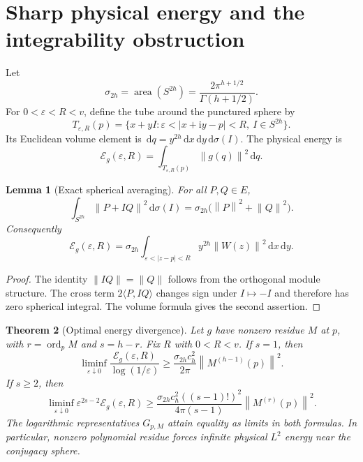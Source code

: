 \documentclass[11pt,a4paper]{article}
\numberwithin{equation}{section}
\newtheorem{theorem}{Theorem}[section]
\newtheorem{lemma}[theorem]{Lemma}
\theoremstyle{definition}
\theoremstyle{remark}
\newcommand{\ii}{\mathrm i}
\newcommand{\ord}{\operatorname{ord}}
\newcommand{\dd}{\,\mathrm d}
\newcommand{\norm}[1]{\left\lVert#1\right\rVert}
\newcommand{\sig}{\sigma_{2h}}
\begin{document}
\section{Sharp physical energy and the integrability obstruction}
\label{sec:energy}

Let
\[
 \sig=\operatorname{area}(S^{2h})
       =\frac{2\pi^{h+1/2}}{\Gamma(h+1/2)}.
\]
For $0<\varepsilon<R<v$, define the tube around the punctured sphere by
\[
 T_{\varepsilon,R}(p)
 =\{x+yI:\varepsilon<|x+\ii y-p|<R,\ I\in S^{2h}\}.
\]
Its Euclidean volume element is
$\dd q=y^{2h}\dd x\dd y\dd\sigma(I)$. The physical energy is
\begin{equation}\label{eq:physical-energy}
 \mathcal E_g(\varepsilon,R)
 =\int_{T_{\varepsilon,R}(p)}\norm{g(q)}^2\dd q.
\end{equation}

\begin{lemma}[Exact spherical averaging]\label{lem:spherical-average}
For all $P,Q\in E$,
\begin{equation}\label{eq:spherical-average}
 \int_{S^{2h}}\norm{P+IQ}^2\dd\sigma(I)
 =\sig\bigl(\norm P^2+\norm Q^2\bigr).
\end{equation}
Consequently
\begin{equation}\label{eq:pair-energy}
 \mathcal E_g(\varepsilon,R)
 =\sig\int_{\varepsilon<|z-p|<R}y^{2h}\norm{W(z)}^2\dd x\dd y.
\end{equation}
\end{lemma}

\begin{proof}
The identity $\norm{IQ}=\norm Q$ follows from the orthogonal module structure.
The cross term $2\langle P,IQ\rangle$ changes sign under $I\mapsto-I$ and
therefore has zero spherical integral. The volume formula gives the second
assertion.
\end{proof}

\begin{theorem}[Optimal energy divergence]\label{thm:energy}
Let $g$ have nonzero residue $M$ at $p$, with $r=\ord_pM$ and $s=h-r$.
Fix $R$ with $0<R<v$. If $s=1$, then
\begin{equation}\label{eq:energy-log}
 \liminf_{\varepsilon\downarrow0}
 \frac{\mathcal E_g(\varepsilon,R)}{\log(1/\varepsilon)}
 \ge \frac{\sig c_h^2}{2\pi}\norm{M^{(h-1)}(p)}^2.
\end{equation}
If $s\ge2$, then
\begin{equation}\label{eq:energy-power}
 \liminf_{\varepsilon\downarrow0}
 \varepsilon^{2s-2}\mathcal E_g(\varepsilon,R)
 \ge\frac{\sig c_h^2((s-1)!)^2}{4\pi(s-1)}
       \norm{M^{(r)}(p)}^2.
\end{equation}
The logarithmic representatives $G_{p,M}$ attain equality as limits in both
formulas. In particular, nonzero polynomial residue forces infinite physical
$L^2$ energy near the conjugacy sphere.
\end{theorem}
\end{document}
